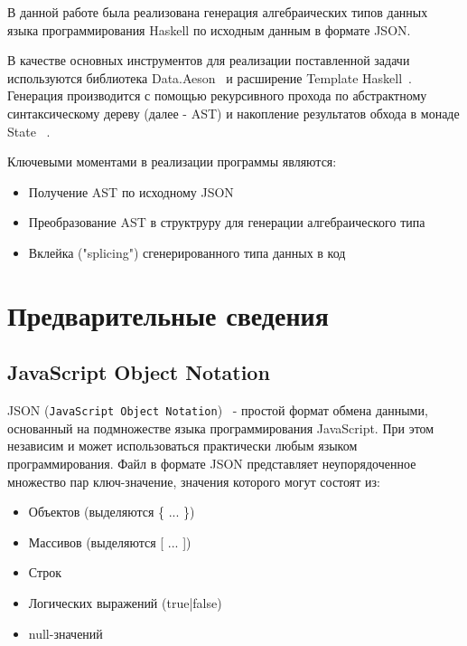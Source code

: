 


\graphicspath{ {img/} }




\Intro
В данной работе была реализована генерация алгебраических типов данных языка программирования Haskell 
по исходным данным в формате JSON.

В качестве основных инструментов для реализации поставленной задачи используются 
библиотека Data.Aeson~\cite{aeson} и расширение Template Haskell~\cite{tempHaskell}. Генерация 
производится с помощью рекурсивного прохода по абстрактному синтаксическому дереву (далее - AST) и 
накопление результатов обхода в монаде State ~\cite{stateM}.

Ключевыми моментами в реализации программы являются:

\begin{itemize}
  \item Получение AST по исходному JSON
  \item Преобразование AST в структруру для генерации алгебраического типа  
  \item Вклейка ("splicing") сгенерированного типа данных в код
\end{itemize}

\chapter{Предварительные сведения}

\section{JavaScript Object Notation}

JSON (\lstinline{JavaScript Object Notation})~\cite{jsonStandart} - простой формат обмена данными, основанный на подмножестве языка программирования JavaScript. При этом независим и может использоваться практически любым языком программирования. Файл в формате JSON представляет неупорядоченное множество пар ключ-значение, значения которого могут состоят из:  

\begin{itemize}
  \item Объектов (выделяются \{ ... \})
  \item Массивов (выделяются [ ... ])
  \item Строк
  \item Логических выражений (true|false)
  \item null-значений
\end{itemize}

